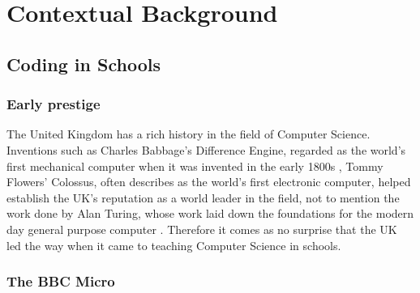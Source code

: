 \documentclass[ %
                    author={Jonathan Rankin},
                supervisor={Dr. David May, Dr. Ian Holyer},
                    degree={MEng},
                     title={CodeTouch},
                  subtitle={A Revolutionary Way To Program Real Code On Touch Screen Devices},
                      type={enterprise},
                      year={2015 } ]{dissertation}
\begin{document}
\mainmatter


\chapter{Contextual Background}
\label{chap:context}

\section{Coding in Schools}

\subsection{Early prestige}

The United Kingdom has a rich history in the field of Computer Science. Inventions such as Charles Babbage's Difference Engine, regarded as the world's first mechanical computer when it was invented in the early 1800s \cite{Swade}, Tommy Flowers' Colossus, often describes as the world's first electronic computer, \cite{mackintosh2008first} helped establish the UK's reputation as a world leader in the field, not to mention the work done by Alan Turing, whose work laid down the foundations for the modern day general purpose computer \cite{Newman253}. Therefore it comes as no surprise that the UK led the way when it came to teaching Computer Science in schools. 

\subsection{The BBC Micro}\label{sssec:bbcMicro}
\end{document}

